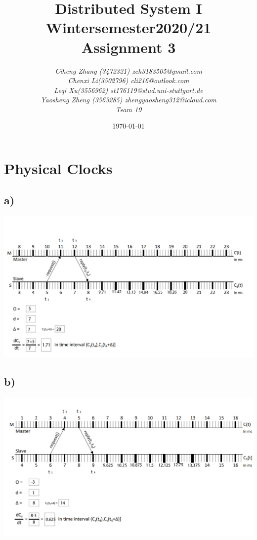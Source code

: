 \documentclass{article}
\begin{document}
\begin{titlepage}
    \title{\Huge \textbf{Distributed System I\\Wintersemester2020/21\\Assignment 3} }
    \author{\LARGE \textsl{Ciheng Zhang (3472321) zch3183505@gmail.com}\\\LARGE \textsl{Chenxi Li(3502796) cli216@outlook.com }\\\LARGE \textsl{Leqi Xu(3556962) st176119@stud.uni-stuttgart.de} \\\LARGE \textsl{Yaosheng Zheng (3563285) zhengyaosheng312@icloud.com}\\\LARGE \textsl{Team 19 } \\[200pt]}
    \date{\today}
    \maketitle
    \thispagestyle{empty}
\end{titlepage}
\newpage
\section{Physical Clocks}
\subsection*{a)}
\includegraphics[scale=0.5]{f1.jpg}
\subsection*{b)}
\includegraphics[scale=0.5]{f2.jpg}
\end{document}

